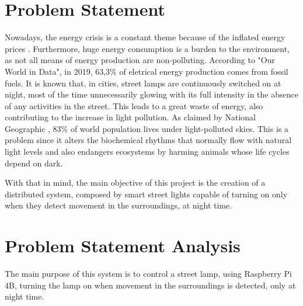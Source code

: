 \section{Problem Statement}
Nowadays, the energy crisis is a constant theme because of the inflated energy prices \cite{energy_crisis}. Furthermore, huge energy consumption is a burden to the environment, as not all means of energy production are non-polluting. According to "Our World in Data"\cite{owidenergy}, in 2019, 63,3\% of eletrical energy production comes from fossil fuels. It is known that, in cities, street lamps are continuously switched on at night, most of the time unnecessarily glowing with its full intensity in the absence of any activities in the street.  This leads to a great waste of energy, also contributing to the increase in light pollution. As claimed by National Geographic \cite{light_pollution}, 83\% of world population lives under light-polluted skies. This is a problem since it alters the biochemical rhythms that normally flow with natural light levels and also endangers ecosystems by harming animals whose life cycles depend on dark.

With that in mind, the main objective of this project is the creation of a distributed system, composed by smart street lights capable of turning on only when they detect movement in the surroundings, at night time. 

\section{Problem Statement Analysis}


The main purpose of this system is to control a street lamp, using Raspberry Pi 4B, turning the lamp on when movement in the surroundings is detected, only at night time. 

